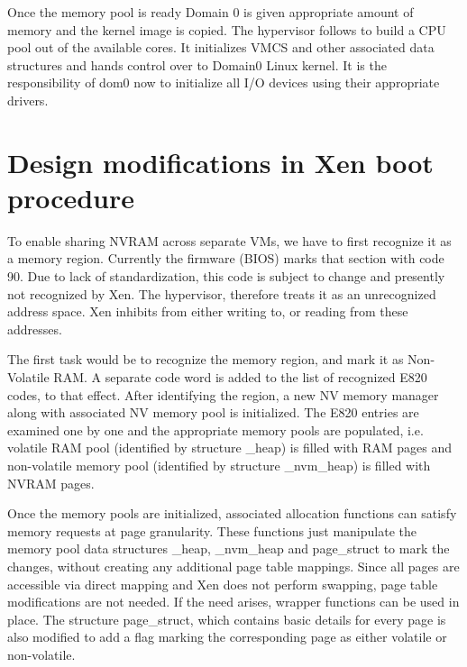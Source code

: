  

Once the memory pool is ready Domain 0 is given appropriate amount of memory and the kernel image is copied. The hypervisor follows to build a CPU pool out of the available cores. It initializes VMCS and other associated data structures and hands control over to Domain0 Linux kernel. It is the responsibility of dom0 now to initialize all I/O devices using their appropriate drivers. 

 

\section{Design modifications in Xen boot procedure}

To enable sharing NVRAM across separate VMs, we have to first recognize it as a memory region. Currently the firmware (BIOS) marks that section with code 90. Due to lack of standardization, this code is subject to change and presently not recognized by Xen. The hypervisor, therefore treats it as an unrecognized address space. Xen inhibits from either writing to, or reading from these addresses. 

 

The first task would be to recognize the memory region, and mark it as Non-Volatile RAM. A separate code word is added to the list of recognized E820 codes, to that effect. After identifying the region, a new NV memory manager along with associated NV memory pool is initialized. The E820 entries are examined one by one and the appropriate memory pools are populated, i.e. volatile RAM pool (identified by structure \_heap) is filled with RAM pages and non-volatile memory pool (identified by structure \_nvm\_heap) is filled with NVRAM pages. 

 

Once the memory pools are initialized, associated allocation functions can satisfy memory requests at page granularity. These functions just manipulate the memory pool data structures \_heap, \_nvm\_heap and page\_struct to mark the changes, without creating any additional page table mappings. Since all pages are accessible via direct mapping and Xen does not perform swapping, page table modifications are not needed. If the need arises, wrapper functions can be used in place. The structure page\_struct, which contains basic details for every page is also modified to add a flag marking the corresponding page as either volatile or non-volatile.  

 

